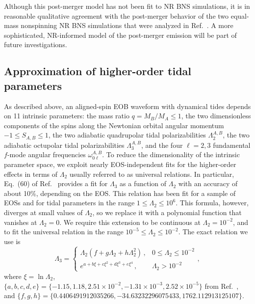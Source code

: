\documentclass[prd,aps,letter,twocolumn,floatfix,notitlepage,nofootinbib]{revtex4-1}
\begin{document}
Although this post-merger model has not been fit to NR BNS simulations, it is in reasonable qualitative agreement with the post-merger behavior of the two equal-mass nonspinning NR BNS simulations that were analyzed in Ref.~\cite{Hinderer:2016eia}. A more sophisticated, NR-informed model of the post-merger emission will be part of future investigations.


\subsection{Approximation of higher-order tidal parameters}

As described above, an aligned-spin EOB waveform with dynamical tides depends on 11 intrinsic parameters: the mass ratio $q=M_B/M_A\leq1$, the two dimensionless components of the spins along the Newtonian orbital angular momentum $-1 \leq S_{A,B} \leq 1$, the two adiabatic quadrupolar tidal polarizabilities $\Lambda_2^{A,B}$, the two adiabatic octupolar tidal polarizabilities $\Lambda_3^{A,B}$, and the four $\ell=2,3$ fundamental $f$-mode angular frequencies $\omega_{0\ell}^{A,B}$. To reduce the dimensionality of the intrinsic parameter space, we exploit nearly EOS-independent fits for the higher-order effects in terms of $\Lambda_2$ usually referred to as universal relations. In particular, Eq.~(60) of Ref.~\cite{Yagi:2013sva} provides a fit for $\Lambda_3$ as a function of $\Lambda_2$ with an accuracy of about 10\%, depending on the EOS. This relation has been fit for a sample of EOSs and for tidal parameters in the range $1 \leq \Lambda_2\leq10^6$. This formula, however, diverges at small values of $\Lambda_2$, so we replace it with a polynomial function that vanishes at $\Lambda_2 = 0$. We require this extension to be continuous at $\Lambda_2 = 10^{-2}$, and to fit the universal relation in the range $10^{-5}\leq\Lambda_2\leq10^{-2}$. The exact relation we use is
\begin{equation}
\Lambda_3 = \left\{\begin{array}{ll}
\Lambda_2 (f + g \Lambda_2 + h \Lambda_2^2)\, , & 0 \leq \Lambda_2 \leq 10^{-2} \\
e^{a + b \xi + c \xi^2 + d \xi^3 + e \xi^4}\, , & \Lambda_2>10^{-2}
\end{array}\right.,
\end{equation}
where $\xi = \ln\Lambda_2$, $\{a, b, c, d, e\} = \{-1.15, 1.18, 2.51\times 10^{-2}, -1.31\times 10^{-3}, 2.52\times 10^{-5}\}$ from Ref.~\cite{Yagi:2013sva}, and $\{f, g, h\}=\{0.4406491912035266, -34.63232296075433,1762.112913125107\}$.
\end{document}
